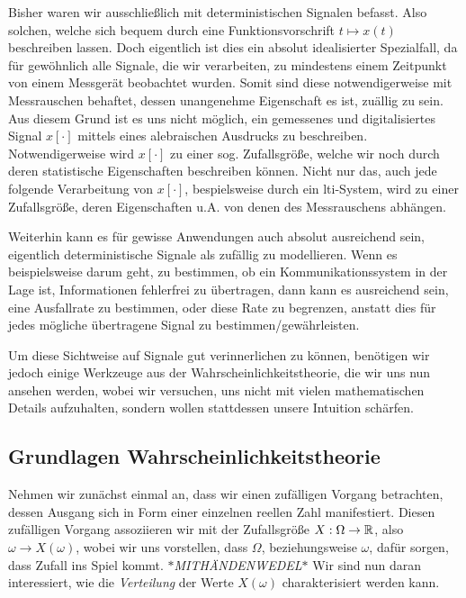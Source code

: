 Bisher waren wir ausschließlich mit deterministischen Signalen befasst. 
Also solchen, welche sich bequem durch eine Funktionsvorschrift $t \mapsto x(t)$ beschreiben lassen.
Doch eigentlich ist dies ein absolut idealisierter Spezialfall, da für gew\"ohnlich alle Signale, die wir verarbeiten, zu mindestens einem Zeitpunkt von einem Messgerät beobachtet wurden.
Somit sind diese notwendigerweise mit Messrauschen behaftet, dessen unangenehme Eigenschaft es ist, zuällig zu sein.
Aus diesem Grund ist es uns nicht m\"oglich, ein gemessenes und digitalisiertes Signal $x[\cdot]$ mittels eines alebraischen Ausdrucks zu beschreiben.
Notwendigerweise wird $x[\cdot]$ zu einer sog. Zufallsgr\"oße, welche wir  noch durch deren statistische Eigenschaften beschreiben k\"onnen.
Nicht nur das, auch jede folgende Verarbeitung von $x[\cdot]$, bespielsweise durch ein \gls{lti}-System, wird zu einer Zufallsgr\"oße, deren Eigenschaften u.A. von denen des Messrauschens abhängen.

Weiterhin kann es für gewisse Anwendungen auch absolut ausreichend sein, eigentlich deterministische Signale als zufällig zu modellieren.
Wenn es beispielsweise darum geht, zu bestimmen, ob ein Kommunikationssystem in der Lage ist, Informationen fehlerfrei zu übertragen, dann kann es ausreichend sein,  eine Ausfallrate zu bestimmen, oder diese Rate zu begrenzen, anstatt dies für jedes m\"ogliche übertragene Signal zu bestimmen/gewährleisten.

Um diese  Sichtweise auf Signale gut verinnerlichen zu k\"onnen, ben\"otigen wir jedoch einige Werkzeuge aus der Wahrscheinlichkeitstheorie, die wir uns nun ansehen werden, wobei wir versuchen, uns nicht mit vielen mathematischen Details aufzuhalten, sondern wollen stattdessen unsere Intuition schärfen.

\subsection{Grundlagen Wahrscheinlichkeitstheorie}\label{sec:random:prbly}

Nehmen wir zunächst einmal an, dass wir einen zufälligen Vorgang betrachten, dessen Ausgang sich in Form einer einzelnen reellen Zahl manifestiert.
Diesen zufälligen Vorgang assoziieren wir mit der Zufallsgr\"oße $X : \Omega \rightarrow \mathbb{R}$, also $\omega \rightarrow X(\omega)$, wobei wir uns vorstellen, dass $\Omega$, beziehungsweise $\omega$, dafür sorgen, dass Zufall ins Spiel kommt. \textit{$\ast$MITHÄNDENWEDEL$\ast$} Wir sind nun daran interessiert, wie die \emph{Verteilung} der Werte $X(\omega)$ charakterisiert werden kann.

